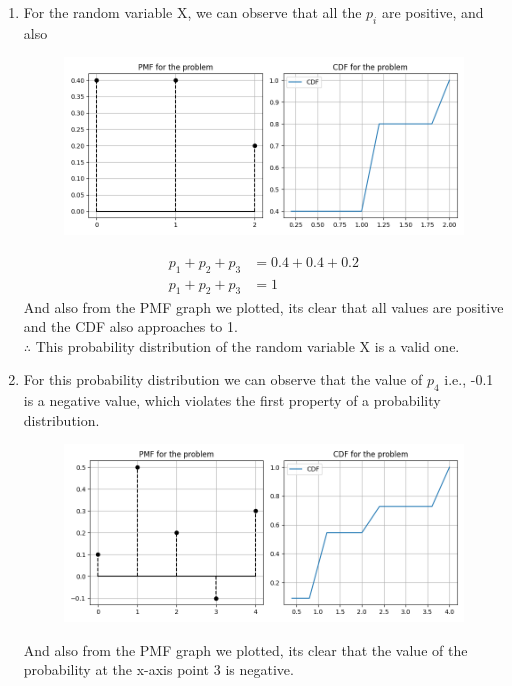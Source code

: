 \documentclass[journal,12pt,twocolumn]{IEEEtran}
\begin{document}
\begin{enumerate}[label=(\roman*)]
    \item For the random variable X, we can observe that all the $p_i$ are positive, and also
    \begin{figure}[htb] 
		\centering
		\includegraphics[width=\columnwidth]{Figure_1}
	\end{figure}
    \begin{align}
    p_1 + p_2 + p_3 &= 0.4 + 0.4 + 0.2\\ 
   p_1 + p_2 + p_3 &= 1
    \end{align}
    And also from the PMF graph we plotted, its clear that all values are positive and the CDF also approaches to 1.\\
    $\therefore$ This probability distribution of the random variable X is a valid one.
	      \item For this probability distribution we can observe that the value of $p_4$ i.e., -0.1 is a negative value, which violates the first property of a probability distribution.\\
	      \begin{figure}[htb] 
		\centering
		\includegraphics[width=\columnwidth]{Figure_2}
	\end{figure}
	And also from the PMF graph we plotted, its clear that the value of the probability at the x-axis point 3 is negative.\\

\end{enumerate}
\end{document}
